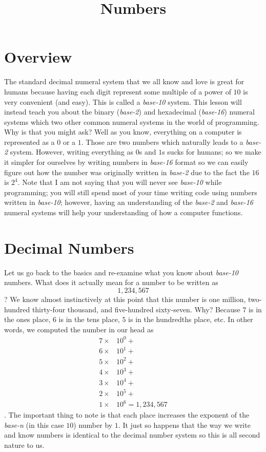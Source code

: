 \documentclass{article}
\title{Numbers}
\begin{document}
\maketitle

\section{Overview}

The standard decimal numeral system that we all know and love is great for humans because having each digit represent some multiple of a power of $10$ is very convenient (and easy).
This is called a \textit{base-10} system.
This lesson will instead teach you about the binary (\textit{base-2}) and hexadecimal (\textit{base-16}) numeral systems which two other common numeral systems in the world of programming.
Why is that you might ask?
Well as you know, everything on a computer is represented as a $0$ or a $1$. 
Those are two numbers which naturally leads to a \textit{base-2} system.
However, writing everything as $0$s and $1$s sucks for humans; so we make it simpler for ourselves by writing numbers in \textit{base-16} format so we can easily figure out how the number was originally written in \textit{base-2} due to the fact the $16$ is $2^4$.
Note that I am not saying that you will never see \textit{base-10} while programming; you will still spend most of your time writing code using numbers written in \textit{base-10}; however, having an understanding of the \textit{base-2} and \textit{base-16} numeral systems will help your understanding of how a computer functions.

\section{Decimal Numbers}

Let us go back to the basics and re-examine what you know about \textit{base-10} numbers.
What does it actually mean for a number to be written as
\begin{equation}
1, 234, 567
\end{equation}
?
We know almost instinctively at this point that this number is one million, two-hundred thirty-four thousand, and five-hundred sixty-seven.
Why?
Because $7$ is in the ones place, $6$ is in the tens place, $5$ is in the hundredths place, etc.
In other words, we computed the number in our head as
\begin{align}
7 \times & 10^0 + \\
6 \times & 10^1 + \\
5 \times & 10^2 + \\
4 \times & 10^3 + \\
3 \times & 10^4 + \\
2 \times & 10^5 + \\
1 \times & 10^6 = 1,234,567
\end{align}
.
The important thing to note is that each place increases the exponent of the \textit{base-n} (in this case $10$) number by $1$.
It just so happens that the way we write and know numbers is identical to the decimal number system so this is all second nature to us.
\end{document}
